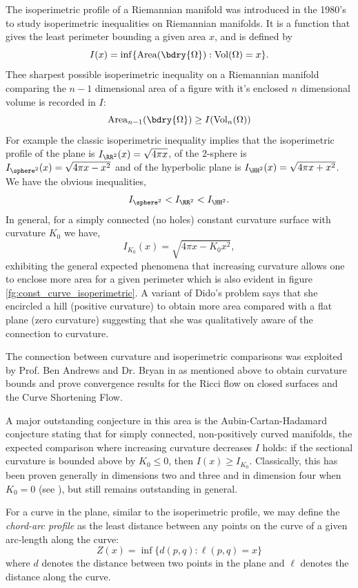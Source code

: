 \documentclass[12pt]{amsart}
\begin{document}
The isoperimetric profile of a Riemannian manifold was introduced in the 1980's \cite{MR875084,MR999971} to study isoperimetric inequalities on Riemannian manifolds. It is a function that gives the least perimeter bounding a given area $x$, and is defined by
\[
I(x) = \inf\{\operatorname{Area} (\bdry{\Omega}) : \operatorname{Vol}(\Omega) = x\}.
\]
Thee sharpest possible isoperimetric inequality on a Riemannian manifold comparing the $n-1$ dimensional area of a figure with it's enclosed $n$ dimensional volume is recorded in $I$:
\[
\operatorname{Area}_{n-1} (\bdry{\Omega}) \geq I(\operatorname{Vol}_n(\Omega))
\]
For example the classic isoperimetric inequality implies that the isoperimetric profile of the plane is $I_{\RR^2}(x) = \sqrt{4\pi x}$, of the $2$-sphere is $I_{\sphere^2}(x) = \sqrt{4\pi x - x^2}$ and of the hyperbolic plane is $I_{\HH^2} (x) = \sqrt{4\pi x + x^2}$. We have the obvious inequalities,
\[
I_{\sphere^2} < I_{\RR^2} < I_{\HH^2}.
\]
In general, for a simply connected (no holes) constant curvature surface with curvature $K_0$ we have,
\[
I_{K_0}(x) = \sqrt{4\pi x - K_0 x^2},
\]
exhibiting the general expected phenomena that increasing curvature allows one to enclose more area for a given perimeter which is also evident in figure \ref{fg:const_curve_isoperimetric}. A variant of Dido's problem says that she encircled a hill (positive curvature) to obtain more area compared with a flat plane (zero curvature) suggesting that she was qualitatively aware of the connection to curvature.

The connection between curvature and isoperimetric comparisons was exploited by Prof. Ben Andrews and Dr. Bryan in \cite{MR2729306,MR2843240,pbthesis,Bryan} as mentioned above to obtain curvature bounds and prove convergence results for the Ricci flow on closed surfaces and the Curve Shortening Flow.

A major outstanding conjecture in this area is the Aubin-Cartan-Hadamard conjecture \cite{MR936419} stating that for simply connected, non-positively curved manifolds, the expected comparison where increasing curvature decreases $I$ holds: if the sectional curvature is bounded above by $K_0 \leq 0$, then $I(x) \geq I_{K_0}$. Classically, this has been proven generally in dimensions two and three and in dimension four when $K_0 = 0$ (see \cite{MR2167269}), but still remains outstanding in general.

For a curve in the plane, similar to the isoperimetric profile, we may define the \emph{chord-arc profile} as the least distance between any points on the curve of a given arc-length along the curve:
\[
Z(x) = \inf\{d(p, q) : \ell(p, q) = x\}
\]
where $d$ denotes the distance between two points in the plane and $\ell$ denotes the distance along the curve.
\end{document}
